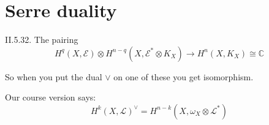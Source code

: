 \section{Serre duality}
\label{section-serre-duality}

\begin{theorem} \label{theorem-serre-duality} \cite{voi}
II.5.32. The pairing
$$
H^q(X,\mathcal{E})\otimes
H^{n-q}(X,\mathcal{E}^*\otimes K_X)\to H^{n}(X,K_X)\cong\mathbb{C}
$$

\end{theorem}

So when you put the dual \(\vee\) on one of these you get isomorphism.

Our course version says:
$$
H^{k}(X,\mathcal{L})^{\vee}=H^{n-k}(X,\omega_X \otimes \mathcal{L}^*)
$$





